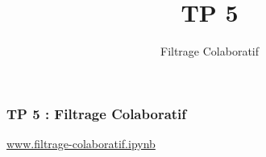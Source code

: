\documentclass{formation}
\title{TP 5}
\subtitle{Filtrage Colaboratif}
\begin{document}
\maketitle

\begin{frame}
  \frametitle{TP 5 : Filtrage Colaboratif}
  \begin{center}
    \href{https://colab.research.google.com/github/google/eng-edu/blob/master/ml/recommendation-systems/recommendation-systems.ipynb?utm_source=ss-recommendation-systems&utm_campaign=colab-external&utm_medium=referral&utm_content=recommendation-systems}{www.filtrage-colaboratif.ipynb}
  \end{center}
\end{frame}
\end{document}
